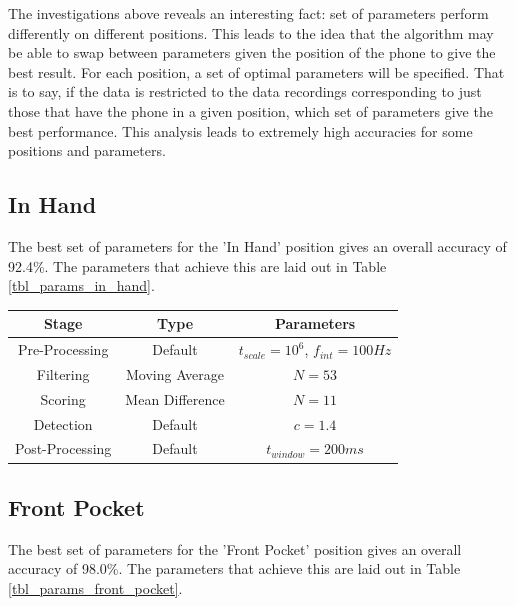             The investigations above reveals an interesting fact: set of parameters perform differently on different positions. This leads to the idea that the algorithm may be able to swap between parameters given the position of the phone to give the best result. For each position, a set of optimal parameters will be specified. That is to say, if the data is restricted to the data recordings corresponding to just those that have the phone in a given position, which set of parameters give the best performance. This analysis leads to extremely high accuracies for some positions and parameters.

            \subsection{In Hand}

                The best set of parameters for the 'In Hand' position gives an overall accuracy of 92.4\%. The parameters that achieve this are laid out in Table \ref{tbl_params_in_hand}.

                \begin{center}
                    \label{tbl_params_in_hand}
                    \begin{tabular}{|c|c|c|}
                        \hline
                        Stage & Type & Parameters \\
                        \hline
                        Pre-Processing & Default & $t_{scale}=10^6$, $f_{int}=100Hz$ \\
                        Filtering & Moving Average & $N=53$ \\
                        Scoring & Mean Difference & $N=11$ \\
                        Detection & Default & $c=1.4$ \\
                        Post-Processing & Default & $t_{window}=200ms$ \\
                        \hline
                    \end{tabular}
                \end{center}

            \subsection{Front Pocket}

                The best set of parameters for the 'Front Pocket' position gives an overall accuracy of 98.0\%. The parameters that achieve this are laid out in Table \ref{tbl_params_front_pocket}.

